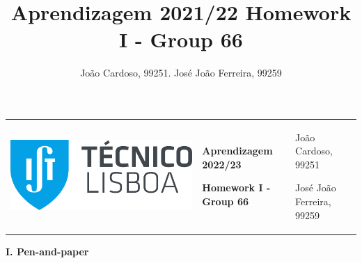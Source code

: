 \documentclass[11pt,a4paper]{article}
\title{Aprendizagem 2021/22 Homework I - Group 66}
\author{João Cardoso, 99251. José João Ferreira, 99259}
\begin{document}
\color{darkgray}
\hspace{-8.25mm}
\begin{tabularx}{1.09\textwidth} {>{\raggedright\arraybackslash}X >{\centering\arraybackslash}X >{\raggedleft\arraybackslash}X}
  \includegraphics[scale=0.2]{tecnico.pdf} &
  \textbf{Aprendizagem 2022/23} \par \textbf{Homework I - Group 66} &
  João Cardoso, 99251 \par José João Ferreira, 99259
\end{tabularx}
\color{black}

\begin{center}
\textbf{I. Pen-and-paper}
\end{center}
\end{document}
